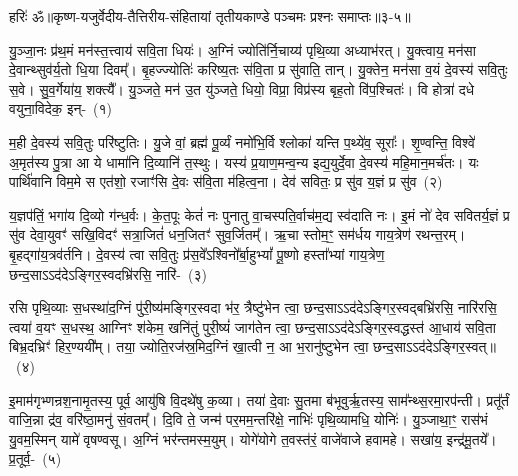 {हरिः॑ ॐ}{॥कृष्ण-यजुर्वेदीय-तैत्तिरीय-संहितायां तृतीयकाण्डे पञ्चमः प्रश्नः समाप्तः॥३-५॥}


\setcounter{anuvakam}{0}
यु॒ञ्जा॒नः प्र॑थ॒मं मन॑स्त॒त्त्वाय॑ सवि॒ता धियः॑। अ॒ग्निं ज्योति॑र्नि॒चाय्य॑ पृथि॒व्या अध्याभ॑रत्। यु॒क्त्वाय॒ मन॑सा दे॒वान्थ्सुव॑र्य॒तो धि॒या दिवम्᳚। बृ॒हज्ज्योतिः॑ करिष्य॒तः स॑वि॒ता प्र सु॑वाति॒ तान्। यु॒क्तेन॒ मन॑सा व॒यं दे॒वस्य॑ सवि॒तुः स॒वे। सु॒व॒र्गेया॑य॒ शक्त्यै᳚। यु॒ञ्जते॒ मन॑ उ॒त यु॑ञ्जते॒ धियो॒ विप्रा॒ विप्र॑स्य बृह॒तो वि॑प॒श्चितः॑। वि होत्रा॑ दधे वयुना॒विदेक॒ इन्-~(१)

म॒ही दे॒वस्य॑ सवि॒तुः परि॑ष्टुतिः। यु॒जे वां॒ ब्रह्म॑ पू॒र्व्यं नमो॑भि॒र्वि श्लोका॑ यन्ति प॒थ्ये॑व॒ सूराः᳚। शृ॒ण्वन्ति॒ विश्वे॑ अ॒मृत॑स्य पु॒त्रा आ ये धामा॑नि दि॒व्यानि॑ त॒स्थुः। यस्य॑ प्र॒याण॒मन्व॒न्य इद्य॒युर्दे॒वा दे॒वस्य॑ महि॒मान॒मर्च॑तः। यः पार्थि॑वानि विम॒मे स एत॑शो॒ रजाꣳ॑सि दे॒वः स॑वि॒ता म॑हित्व॒ना। देव॑ सवितः॒ प्र सु॑व य॒ज्ञं प्र सु॑व~(२)

य॒ज्ञप॑तिं॒ भगा॑य दि॒व्यो ग॑न्ध॒र्वः। के॒त॒पूः केतं॑ नः पुनातु वा॒चस्पति॒र्वाच॑म॒द्य स्व॑दाति नः। इ॒मं नो॑ देव सवितर्य॒ज्ञं प्र सु॑व देवा॒युवꣳ॑ सखि॒विदꣳ॑ सत्रा॒जितं॑ धन॒जितꣳ॑ सुव॒र्जितम्᳚। ऋ॒चा स्तोम॒ꣳ॒ सम॑र्धय गाय॒त्रेण॑ रथन्त॒रम्। बृ॒हद्गा॑य॒त्रव॑र्तनि। दे॒वस्य॑ त्वा सवि॒तुः प्र॑स॒वे᳚\-ऽश्विनो᳚र्बा॒हु\-भ्यां᳚ पू॒ष्णो हस्ता᳚भ्यां गाय॒त्रेण॒ छन्द॒सा\-ऽऽ\-द॑दे\-ऽङ्गिर॒स्वदभ्रि॑रसि॒ नारि॑-~(३)

रसि पृथि॒व्याः स॒धस्था॑द॒ग्निं पु॑री॒ष्य॑मङ्गिर॒\-स्वदा भ॑र॒ त्रैष्टु॑भेन त्वा॒ छन्द॒सा\-ऽऽ\-द॑दे\-ऽङ्गिर॒स्वद्बभ्रि॑रसि॒ नारि॑रसि॒ त्वया॑ व॒यꣳ स॒धस्थ॒ आग्निꣳ श॑केम॒ खनि॑तुं पुरी॒ष्यं॑ जाग॑तेन त्वा॒ छन्द॒सा\-ऽऽ\-द॑दे\-ऽङ्गिर॒स्वद्धस्त॑ आ॒धाय॑ सवि॒ता बिभ्र॒दभ्रिꣳ॑ हिर॒ण्ययी᳚म्। तया॒ ज्योति॒रज॑स्र॒मिद॒ग्निं खा॒त्वी न॒ आ भ॒रानु॑ष्टुभेन त्वा॒ छन्द॒सा\-ऽऽ\-द॑दे\-ऽङ्गिर॒स्वत्॥~(४)

{\anuvakamend[{इद्य॒ज्ञं प्र सु॑व॒ नारि॒रानु॑ष्टुभेन त्वा॒ छन्द॑सा॒ त्रीणि॑ च}]}%

इ॒माम॑गृभ्णन्रश॒नामृ॒तस्य॒ पूर्व॒ आयु॑षि वि॒दथे॑षु क॒व्या। तया॑ दे॒वाः सु॒तमा ब॑भूवुर्\mbox{}ऋ॒तस्य॒ साम᳚न्थ्स॒रमा॒रप॑न्ती। प्रतू᳚र्तं वाजि॒न्ना द्र॑व॒ वरि॑ष्ठा॒मनु॑ सं॒वतम्᳚। दि॒वि ते॒ जन्म॑ पर॒मम॒न्तरि॑क्षे॒ नाभिः॑ पृथि॒व्यामधि॒ योनिः॑। यु॒ञ्जाथा॒ꣳ॒ रास॑भं यु॒वम॒स्मिन् यामे॑ वृषण्वसू। अ॒ग्निं भर॑न्तमस्म॒युम्। योगे॑योगे त॒वस्त॑रं॒ वाजे॑वाजे हवामहे। सखा॑य॒ इन्द्र॑मू॒तये᳚। प्र॒तूर्व॒-~(५)

